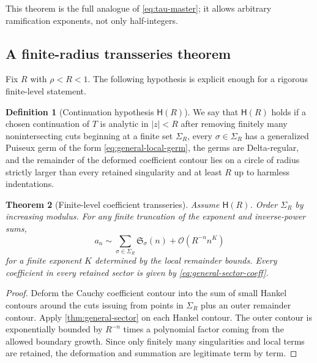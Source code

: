 \documentclass[11pt,oneside]{article}
\numberwithin{equation}{section}
\theoremstyle{plain}
\newtheorem{theorem}{Theorem}[section]
\theoremstyle{definition}
\newtheorem{definition}[theorem]{Definition}
\theoremstyle{remark}
\newcommand{\Ord}{\mathcal O}
\begin{document}
This theorem is the full analogue of \eqref{eq:tau-master}; it allows
arbitrary ramification exponents, not only half-integers.

\subsection{A finite-radius transseries theorem}

Fix $R$ with $\rho<R<1$.  The following hypothesis is explicit enough for a
rigorous finite-level statement.

\begin{definition}[Continuation hypothesis $\mathsf H(R)$]
We say that $\mathsf H(R)$ holds if a chosen continuation of $T$ is analytic
in $|z|<R$ after removing finitely many nonintersecting cuts beginning at a
finite set $\Sigma_R$, every $\sigma\in\Sigma_R$ has a generalized Puiseux
germ of the form \eqref{eq:general-local-germ}, the germs are
Delta-regular, and the remainder of the deformed coefficient contour lies
on a circle of radius strictly larger than every retained singularity and
at least $R$ up to harmless indentations.
\end{definition}

\begin{theorem}[Finite-level coefficient transseries]\label{thm:finite-level}
Assume $\mathsf H(R)$.  Order $\Sigma_R$ by increasing modulus.  For any
finite truncation of the exponent and inverse-power sums,
\begin{equation}\label{eq:finite-level-transseries}
 a_n\sim\sum_{\sigma\in\Sigma_R}\mathfrak S_\sigma(n)
       +\Ord(R^{-n}n^K)
\end{equation}
for a finite exponent $K$ determined by the local remainder bounds.  Every
coefficient in every retained sector is given by
\eqref{eq:general-sector-coeff}.
\end{theorem}

\begin{proof}
Deform the Cauchy coefficient contour into the sum of small Hankel contours
around the cuts issuing from points in $\Sigma_R$ plus an outer remainder
contour.  Apply \cref{thm:general-sector} on each Hankel contour.  The outer
contour is exponentially bounded by $R^{-n}$ times a polynomial factor
coming from the allowed boundary growth.  Since only finitely many
singularities and local terms are retained, the deformation and summation
are legitimate term by term.
\end{proof}
\end{document}
